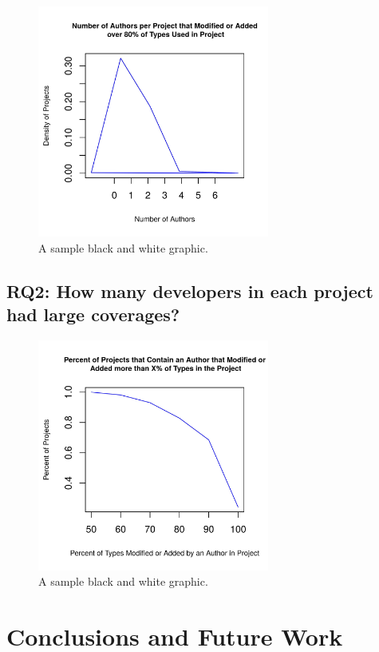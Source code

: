 \documentclass{sig-alternate-05-2015}
\begin{document}
\begin{figure}[ht]
\centering
\includegraphics[height=3in, width=3in]{../lib_stats_Threshold80_dist}
\caption{A sample black and white graphic.}
\end{figure}

\subsection{RQ2: How many developers in each project had large coverages?}

\begin{figure}[ht]
\centering
\includegraphics[height=3in, width=3in]{../lib_stats_count_authors_percent_per_project}
\caption{A sample black and white graphic.}
\end{figure}

\section{Conclusions and Future Work}
\end{document}
